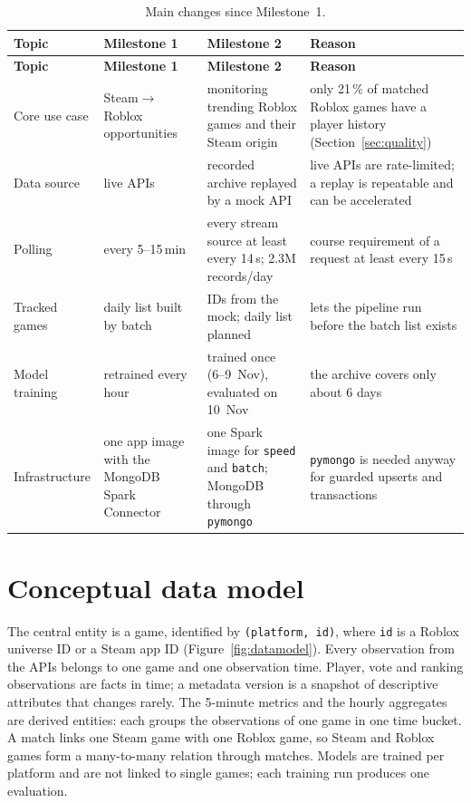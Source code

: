 \documentclass[10pt,a4paper]{article}
\newcommand{\ep}[1]{\texttt{\small #1}}
\begin{document}
{\small
\begin{longtable}{L{2.4cm} L{3.6cm} L{4.6cm} L{4.6cm}}
\caption{Main changes since Milestone~1.}\label{tab:changes}\\
\toprule
\textbf{Topic} & \textbf{Milestone 1} & \textbf{Milestone 2} & \textbf{Reason}\\
\midrule\endfirsthead
\toprule
\textbf{Topic} & \textbf{Milestone 1} & \textbf{Milestone 2} & \textbf{Reason}\\
\midrule\endhead
Core use case & Steam$\rightarrow$Roblox opportunities & monitoring trending Roblox games and their Steam origin & only 21\,\% of matched Roblox games have a player history (Section~\ref{sec:quality})\\
Data source & live APIs & recorded archive replayed by a mock API & live APIs are rate-limited; a replay is repeatable and can be accelerated\\
Polling & every 5--15\,min & every stream source at least every 14\,s; 2.3M records/day & course requirement of a request at least every 15\,s\\
Tracked games & daily list built by batch & IDs from the mock; daily list planned & lets the pipeline run before the batch list exists\\
Model training & retrained every hour & trained once (6--9~Nov), evaluated on 10~Nov & the archive covers only about 6 days\\
Infrastructure & one app image with the MongoDB Spark Connector & one Spark image for \ep{speed} and \ep{batch}; MongoDB through \ep{pymongo} & \ep{pymongo} is needed anyway for guarded upserts and transactions\\
\bottomrule
\end{longtable}}

\section{Conceptual data model}\label{sec:model}
The central entity is a game, identified by \ep{(platform, id)}, where \ep{id} is a Roblox universe ID or a Steam app ID (Figure~\ref{fig:datamodel}). Every observation from the APIs belongs to one game and one observation time. Player, vote and ranking observations are facts in time; a metadata version is a snapshot of descriptive attributes that changes rarely. The 5-minute metrics and the hourly aggregates are derived entities: each groups the observations of one game in one time bucket. A match links one Steam game with one Roblox game, so Steam and Roblox games form a many-to-many relation through matches. Models are trained per platform and are not linked to single games; each training run produces one evaluation.
\end{document}
